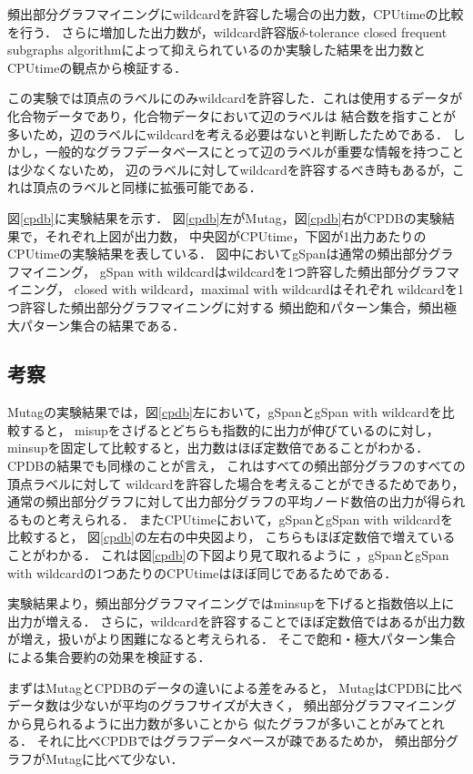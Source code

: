 頻出部分グラフマイニングにwildcardを許容した場合の出力数，CPUtimeの比較を行う．
さらに増加した出力数が，wildcard許容版$\delta$-tolerance closed frequent subgraphs algorithmによって抑えられているのか実験した結果を出力数とCPUtimeの観点から検証する．

この実験では頂点のラベルにのみwildcardを許容した．これは使用するデータが化合物データであり，化合物データにおいて辺のラベルは
結合数を指すことが多いため，辺のラベルにwildcardを考える必要はないと判断したためである．
しかし，一般的なグラフデータベースにとって辺のラベルが重要な情報を持つことは少なくないため，
辺のラベルに対してwildcardを許容するべき時もあるが，これは頂点のラベルと同様に拡張可能である．


図\ref{cpdb}に実験結果を示す．
図\ref{cpdb}左がMutag，図\ref{cpdb}右がCPDBの実験結果で，それぞれ上図が出力数，
中央図がCPUtime，下図が1出力あたりのCPUtimeの実験結果を表している．
図中においてgSpanは通常の頻出部分グラフマイニング，
gSpan with wildcardはwildcardを1つ許容した頻出部分グラフマイニング，
closed with wildcard，maximal with wildcardはそれぞれ
wildcardを1つ許容した頻出部分グラフマイニングに対する
頻出飽和パターン集合，頻出極大パターン集合の結果である．

\subsection{考察}

Mutagの実験結果では，図\ref{cpdb}左において，gSpanとgSpan with wildcardを比較すると，
misupをさげるとどちらも指数的に出力が伸びているのに対し，
minsupを固定して比較すると，出力数はほぼ定数倍であることがわかる．
CPDBの結果でも同様のことが言え，
これはすべての頻出部分グラフのすべての頂点ラベルに対して
wildcardを許容した場合を考えることができるためであり，
通常の頻出部分グラフに対して出力部分グラフの平均ノード数倍の出力が得られるものと考えられる．
またCPUtimeにおいて，gSpanとgSpan with wildcardを比較すると，
図\ref{cpdb}の左右の中央図より，
こちらもほぼ定数倍で増えていることがわかる．
これは図\ref{cpdb}の下図より見て取れるように
，gSpanとgSpan with wildcardの1つあたりのCPUtimeはほぼ同じであるためである．

実験結果より，頻出部分グラフマイニングではminsupを下げると指数倍以上に出力が増える．
さらに，wildcardを許容することでほぼ定数倍ではあるが出力数が増え，扱いがより困難になると考えられる．
そこで飽和・極大パターン集合による集合要約の効果を検証する．

まずはMutagとCPDBのデータの違いによる差をみると，
MutagはCPDBに比べデータ数は少ないが平均のグラフサイズが大きく，
頻出部分グラフマイニングから見られるように出力数が多いことから
似たグラフが多いことがみてとれる．
それに比べCPDBではグラフデータベースが疎であるためか，
頻出部分グラフがMutagに比べて少ない．

